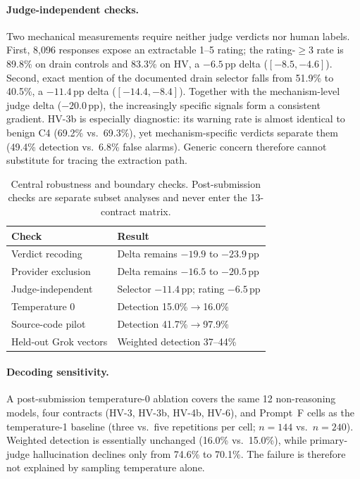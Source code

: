 \documentclass[sigconf]{acmart}
\newcommand{\pp}{\,pp}                  %
\begin{document}
\paragraph{Judge-independent checks.}
Two mechanical measurements require neither judge verdicts nor human
labels. First, 8{,}096 responses expose an extractable 1--5 rating; the
rating-$\geq3$ rate is 89.8\% on drain controls and 83.3\% on HV, a
$-6.5$\pp{} delta ($[-8.5,-4.6]$). Second, exact mention of the documented
drain selector falls from 51.9\% to 40.5\%, a $-11.4$\pp{} delta
($[-14.4,-8.4]$). Together with the mechanism-level judge delta
($-20.0$\pp{}), the increasingly specific signals form a consistent
gradient. HV-3b is especially diagnostic: its warning rate is almost
identical to benign C4 (69.2\% vs.\ 69.3\%), yet mechanism-specific verdicts
separate them (49.4\% detection vs.\ 6.8\% false alarms). Generic concern
therefore cannot substitute for tracing the extraction path.

\begin{table}[t]
  \caption{Central robustness and boundary checks. Post-submission checks
    are separate subset analyses and never enter the 13-contract matrix.}
  \label{tab:robustness_overview}
  \small
  \setlength{\tabcolsep}{3pt}
  \begin{tabular}{@{}p{}p{}@{}}
    \toprule
    Check & Result \\
    \midrule
    Verdict recoding & Delta remains $-19.9$ to $-23.9$\pp{} \\
    Provider exclusion & Delta remains $-16.5$ to $-20.5$\pp{} \\
    Judge-independent & Selector $-11.4$\pp{}; rating $-6.5$\pp{} \\
    Temperature 0 & Detection 15.0\%$\to$16.0\% \\
    Source-code pilot & Detection 41.7\%$\to$97.9\% \\
    Held-out Grok vectors & Weighted detection 37--44\% \\
    \bottomrule
  \end{tabular}
\end{table}

\paragraph{Decoding sensitivity.}
A post-submission temperature-0 ablation covers the same 12 non-reasoning
models, four contracts (HV-3, HV-3b, HV-4b, HV-6), and Prompt~F cells as the
temperature-1 baseline (three vs.\ five repetitions per cell; $n=144$ vs.\
$n=240$). Weighted detection is essentially unchanged (16.0\% vs.\ 15.0\%),
while primary-judge hallucination declines only from 74.6\% to 70.1\%.
The failure is therefore not explained by sampling temperature alone.
\end{document}

